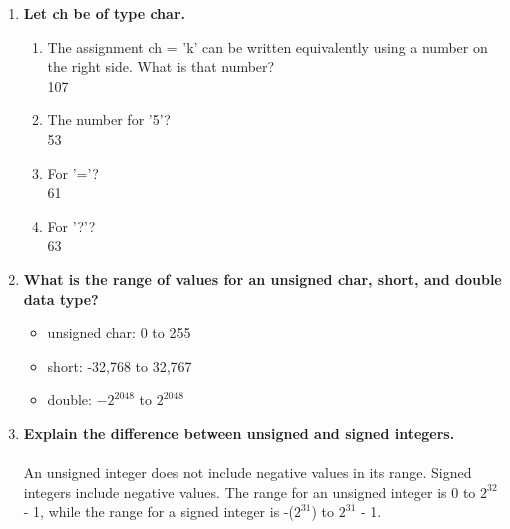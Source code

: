 \documentclass{article}
\begin{document}
\begin{enumerate}[label=\textbf{\arabic*})]
    \item \textbf{Let ch be of type char.} 
        \begin{enumerate}[label=\textbf{\alph*}.]
            \item The assignment ch = ’k’ can be written equivalently using a number on the right side. What is that number? \\
            107
            \item The number for ’5’? \\
            53
            \item For ’=’? \\
            61
            \item For ’?’? \\
            63
        \end{enumerate}
        
    \item \textbf{What is the range of values for an unsigned char, short, and double data type?}
        \begin{itemize}
            \item unsigned char: 0 to 255
            \item short: -32,768 to 32,767
            \item double: $-2^{2048}$ to $2^{2048}$
        \end{itemize}
    
    \pagebreak
    \setcounter{enumi}{9}
    \item \textbf{Explain the difference between unsigned and signed integers.} \\
    \\
    An unsigned integer does not include negative values in its range. Signed integers include negative values. The range for an unsigned integer is 0 to $2^{32}$ - 1, while the range for a signed integer is -($2^{31}$) to $2^{31}$ - 1.
    

\end{enumerate}
\end{document}
